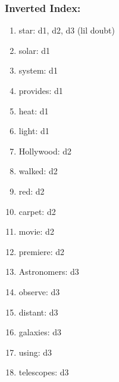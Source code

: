 \documentclass{article}
\begin{document}
\subsubsection{Inverted Index:}
\begin{enumerate}
    \item star: d1, d2, d3 (lil doubt)
    \item solar: d1
    \item system: d1
    \item provides: d1
    \item heat: d1
    \item light: d1
    \item Hollywood: d2
    \item walked: d2
    \item red: d2
    \item carpet: d2
    \item movie: d2
    \item premiere: d2
    \item Astronomers: d3
    \item observe: d3
    \item distant: d3
    \item galaxies: d3
    \item using: d3
    \item telescopes: d3
\end{enumerate}
\end{document}

